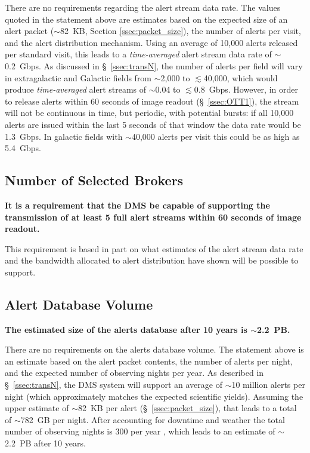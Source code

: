 \documentclass[DM,authoryear,toc]{lsstdoc}
\begin{document}
There are no requirements regarding the alert stream data rate. The values quoted in the statement above are estimates based on the expected size of an alert packet ($\sim$82~KB, Section \ref{ssec:packet_size}), the number of alerts per visit, and the alert distribution mechanism. Using an average of 10,000 alerts released per standard visit, this leads to a {\it time-averaged} alert stream data rate of  $\sim$0.2~Gbps. As discussed in \S~\ref{ssec:transN}, the number of alerts per field will vary in extragalactic and Galactic fields from $\sim$2,000 to $\lesssim$40,000, which would produce {\it time-averaged} alert streams of $\sim$0.04 to $\lesssim$0.8~Gbps. However, in order to release alerts within 60 seconds of image readout (\S~\ref{ssec:OTT1}), the stream will not be continuous in time, but periodic, with potential bursts: if all 10,000 alerts are issued within the last 5 seconds of that window the data rate would be 1.3~Gbps. In galactic fields with $\sim$40,000 alerts per visit this could be as high as 5.4~Gbps.


\subsection{Number of Selected Brokers}\label{ssec:num_brokers}

{\bf It is a requirement that the \gls{DMS} be capable of supporting the transmission of at least 5 full alert streams within 60 seconds of image readout.}

This requirement is based in part on what estimates of the alert stream data rate and the bandwidth allocated to alert distribution have shown will be possible to support.

\subsection{Alert Database Volume}\label{ssec:adb_volume}

{\bf The estimated size of the alerts database after 10 years is $\sim$2.2~PB.}

There are no requirements on the alerts database volume. The statement above is an estimate based on the alert packet contents, the number of alerts per night, and the expected number of observing nights per year. As described in \S~\ref{ssec:transN}, the \gls{DMS} system will support an average of $\sim$10 million alerts per night (which approximately matches the expected scientific yields). Assuming the upper estimate of $\sim$82~KB per alert (\S~\ref{ssec:packet_size}), that leads to a total of $\sim$782~GB per night. After accounting for downtime and weather the total number of observing nights is 300 per year , which leads to an estimate of $\sim$2.2~PB after 10 years.
\end{document}

